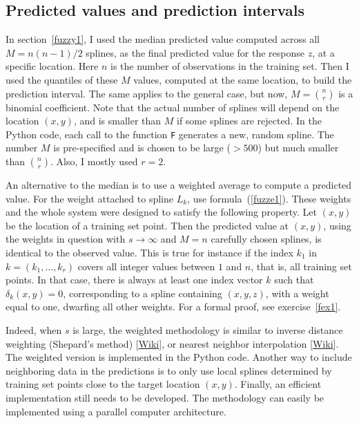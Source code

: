 \documentclass[oneside,10pt]{book}
\begin{document}
\subsection{Predicted values and prediction intervals}\label{fuzq3}

In section~\ref{fuzzy1}, I used the median predicted value computed across all $M=n(n-1)/2$ splines, as the final predicted value for the response $z$, at a specific location. Here $n$ is the number of observations in the training set. Then I used the quantiles of these $M$ values, computed at the same location, to build the prediction interval. The same applies to the general case, but now, $M= {n \choose r}$ is a binomial coefficient. Note that the actual number of splines will depend on the location $(x,y)$, and is smaller than $M$ if some splines are rejected.
In the Python code, each call to the function \texttt{F} generates a new, random spline. The number $M$ is pre-specified and is chosen to be large ($> 500$)
but much smaller than ${n \choose r}$. Also, I mostly used $r=2$.

An alternative to the median is to use a weighted average to compute a predicted value. For the weight attached to spline $L_k$, use formula~(\ref{fuzze1}). These weights and the whole system were designed to satisfy the following property. Let $(x,y)$ be the location of a training set point.  Then the predicted value at $(x,y)$, using the weights in question with $s\rightarrow\infty$ and $M=n$ carefully chosen splines, is identical to the observed value. This is true for instance if the index $k_1$ in $k=(k_1,\dots,k_r)$ covers all integer values between $1$ and $n$, that is, all training set points. In that case, there is always at least one index vector $k$ such that $\delta_k(x,y)=0$, corresponding to a spline containing $(x,y,z)$, with a weight equal to one, dwarfing all other weights. For a formal proof, see exercise~\ref{fex1}.

Indeed, when $s$ is large, the weighted methodology is similar to
\textcolor{index}{inverse distance weighting} (Shepard's method) [\href{https://en.wikipedia.org/wiki/Inverse_distance_weighting}{Wiki}], or
\textcolor{index}{nearest neighbor interpolation} [\href{https://en.wikipedia.org/wiki/Nearest-neighbor_interpolation}{Wiki}]. The weighted version is implemented in the Python code.
Another way to include neighboring data in the predictions is to only use local splines determined by training set points close to the target location $(x,y)$. Finally, an efficient implementation still
needs to be developed. The methodology can easily be implemented using a parallel computer architecture.
\end{document}
